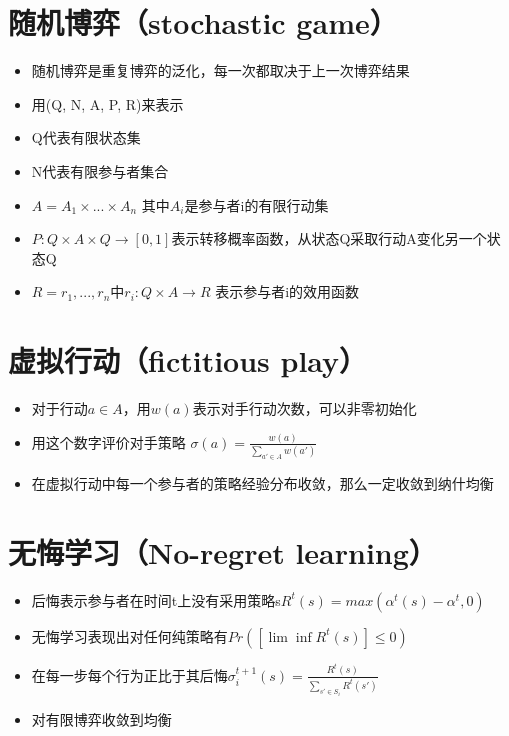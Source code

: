 \documentclass[]{book}
\providecommand{\tightlist}{%
  \setlength{\itemsep}{0pt}\setlength{\parskip}{0pt}}
\begin{document}
\hypertarget{ux968fux673aux535aux5f08stochastic-game}{%
\section{随机博弈（stochastic game）}\label{ux968fux673aux535aux5f08stochastic-game}}

\begin{itemize}
\tightlist
\item
  随机博弈是重复博弈的泛化，每一次都取决于上一次博弈结果
\item
  用(Q, N, A, P, R)来表示
\item
  Q代表有限状态集
\item
  N代表有限参与者集合
\item
  \(A = A_1 \times ... \times A_n\) 其中\(A_i\)是参与者i的有限行动集
\item
  \(P:Q \times A \times Q \rightarrow[0,1]\)表示转移概率函数，从状态Q采取行动A变化另一个状态Q
\item
  \(R = r_1,...,r_n\)中\(r_i:Q\times A\rightarrow R\) 表示参与者i的效用函数
\end{itemize}

\hypertarget{ux865aux62dfux884cux52a8fictitious-play}{%
\section{虚拟行动（fictitious play）}\label{ux865aux62dfux884cux52a8fictitious-play}}

\begin{itemize}
\tightlist
\item
  对于行动\(a\in A\)，用\(w(a)\)表示对手行动次数，可以非零初始化
\item
  用这个数字评价对手策略 \(\sigma(a) = \frac{w(a)}{\sum_{a' \in A}w(a')}\)
\item
  在虚拟行动中每一个参与者的策略经验分布收敛，那么一定收敛到纳什均衡
\end{itemize}

\hypertarget{ux65e0ux6094ux5b66ux4e60no-regret-learning}{%
\section{无悔学习（No-regret learning）}\label{ux65e0ux6094ux5b66ux4e60no-regret-learning}}

\begin{itemize}
\tightlist
\item
  后悔表示参与者在时间t上没有采用策略s\(R^t(s) = max(\alpha^t(s)-\alpha^t,0)\)
\item
  无悔学习表现出对任何纯策略有\(Pr([\lim \inf R^t(s)]\leq0)\)
\item
  在每一步每个行为正比于其后悔\(\sigma_i^{t+1}(s) = \frac{R^t(s)}{\sum_{s'\in S_i}R^t(s')}\)
\item
  对有限博弈收敛到均衡
\end{itemize}
\end{document}
